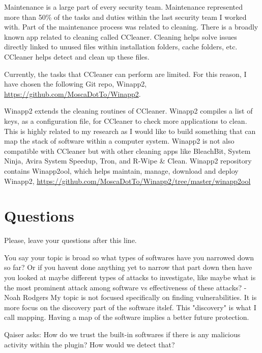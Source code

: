 Maintenance is a large part of every security team. Maintenance represented more than 50\% of the tasks and duties within the last security team I worked with. Part of the maintenance process was related to cleaning. There is a broadly known app related to cleaning called CCleaner. Cleaning helps solve issues directly linked to unused files within installation folders, cache folders, etc. CCleaner helps detect and clean up these files.

Currently, the tasks that CCleaner can perform are limited. For this reason, I have chosen the following Git repo, Winapp2, \url{https://github.com/MoscaDotTo/Winapp2}.

Winapp2 extends the cleaning routines of CCleaner. Winapp2 compiles a list of keys, as a configuration file, for CCleaner to check more applications to clean.
This is highly related to my research as I would like to build something that can map the stack of software within a computer system.
Winapp2 is not also compatible with CCleaner but with other cleaning apps like BleachBit, System Ninja, Avira System Speedup, Tron, and R-Wipe \& Clean. Winapp2 repository contains Winapp2ool, which helps maintain, manage, download and deploy Winapp2, \url{https://github.com/MoscaDotTo/Winapp2/tree/master/winapp2ool}


\section{Questions}
Please, leave your questions after this line.

You say your topic is broad so what types of softwares have you narrowed down so far? Or if you havent done anything yet to narrow that part down then have you looked at maybe different types of attacks to investigate, like maybe what is the most prominent attack among software vs effectiveness of these attacks? -Noah Rodgers
My topic is not focused specifically on finding vulnerabilities. It is more focus on the discovery part of the software itslef. This "discovery" is what I call mapping. Having a map of the software implies a better future protection.


Qaiser asks: How do we trust the built-in softwares if there is any malicious activity within the plugin? How would we detect that?




%
